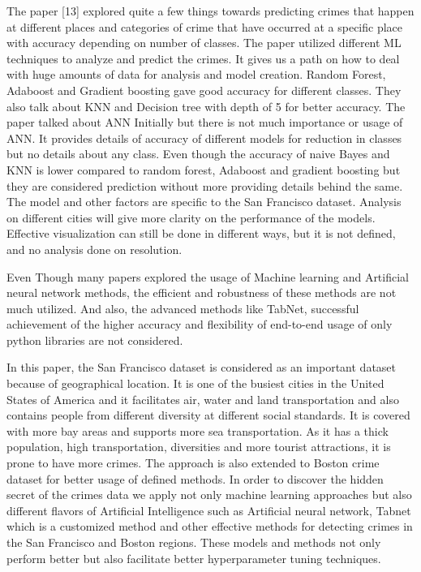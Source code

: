 \documentclass[10 pt,conference,final,]{IEEEtran}
\begin{document}
The paper {[}13{]} explored quite a few things towards predicting crimes
that happen at different places and categories of crime that have
occurred at a specific place with accuracy depending on number of
classes. The paper utilized different ML techniques to analyze and
predict the crimes. It gives us a path on how to deal with huge amounts
of data for analysis and model creation. Random Forest, Adaboost and
Gradient boosting gave good accuracy for different classes. They also
talk about KNN and Decision tree with depth of 5 for better accuracy.
The paper talked about ANN Initially but there is not much importance or
usage of ANN. It provides details of accuracy of different models for
reduction in classes but no details about any class. Even though the
accuracy of naive Bayes and KNN is lower compared to random forest,
Adaboost and gradient boosting but they are considered prediction
without more providing details behind the same. The model and other
factors are specific to the San Francisco dataset. Analysis on different
cities will give more clarity on the performance of the models.
Effective visualization can still be done in different ways, but it is
not defined, and no analysis done on resolution.

Even Though many papers explored the usage of Machine learning and
Artificial neural network methods, the efficient and robustness of these
methods are not much utilized. And also, the advanced methods like
TabNet, successful achievement of the higher accuracy and flexibility of
end-to-end usage of only python libraries are not considered.

In this paper, the San Francisco dataset is considered as an important
dataset because of geographical location. It is one of the busiest
cities in the United States of America and it facilitates air, water and
land transportation and also contains people from different diversity at
different social standards. It is covered with more bay areas and
supports more sea transportation. As it has a thick population, high
transportation, diversities and more tourist attractions, it is prone to
have more crimes. The approach is also extended to Boston crime dataset
for better usage of defined methods. In order to discover the hidden
secret of the crimes data we apply not only machine learning approaches
but also different flavors of Artificial Intelligence such as Artificial
neural network, Tabnet which is a customized method and other effective
methods for detecting crimes in the San Francisco and Boston regions.
These models and methods not only perform better but also facilitate
better hyperparameter tuning techniques.
\end{document}
